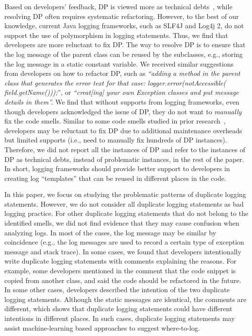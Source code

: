 Based on developers' feedback, DP is viewed more as technical debts~\cite{Kruchten:2012:TDM:2412381.2412847}, while resolving DP often requires systematic refactoring. 
However, to the best of our knowledge, current Java logging frameworks, such as SLF4J and Log4j 2, do not support the use of polymorphism in logging statements. Thus, we find that developers are more reluctant to fix DP. The way to resolve DP is to ensure that the log message of the parent class can be reused by the subclasses, e.g., storing the log message in a static constant variable. We received similar suggestions from developers on how to refactor DP, such as {\it ``adding a method in the parent class that generates the error text for that case:  logger.error(notAccessible( field.getName()));}'', or {\it ``creat[ing] your own Exception classes and put message details in them''.} We find that without supports from logging frameworks, even though developers acknowledged the issue of DP, they do not want to {\em manually} fix the code smells. Similar to some code smells studied in prior research~\cite{Johnson:2013:WDS:2486788.2486877, Silva:2016:WWR:2950290.2950305}, developers may be reluctant to fix DP due to additional maintenance overheads but limited supports (i.e., need to manually fix hundreds of DP instances). Therefore, we did not report all the instances of DP and refer to the instances of DP as technical debts, instead of problematic instances, in the rest of the paper.  In short, logging frameworks should provide better support to developers in creating log ``templates'' that can be reused in different places in the code.  %



 In this paper, we focus on studying the problematic patterns of duplicate logging statements. However, we do not consider all duplicate logging statements as bad logging practice. For other duplicate logging statements that do not belong to the identified smells, we did not find evidence that they may cause confusion when analyzing logs. In most of the cases, the log message may be similar by coincidence (e.g., the log messages are used to record a certain type of exception message and stack trace). In some cases, we found that developers intentionally write duplicate logging statements with comments explaining the reasons. For example, some developers mentioned in the comment that the code snippet is copied from another class, and said the code should be refactored in the future. In some other cases, developers described the intention of the two duplicate logging statements. Although the static messages are identical, the comments are different, which shows that duplicate logging statements could have different intentions in different places. In such cases, duplicate logging statements may assist machine-learning based approaches to suggest where-to-log.


\vspace{-0.2cm}




